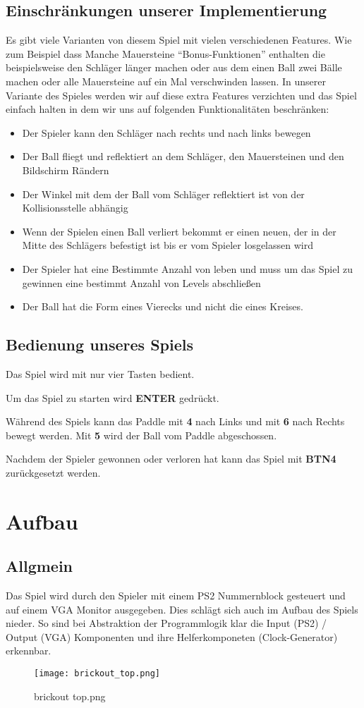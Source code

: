 \documentclass{scrartcl}
\begin{document}
\subsection{Einschränkungen unserer Implementierung}
Es gibt viele Varianten von diesem Spiel mit vielen verschiedenen Features.
Wie zum Beispiel dass Manche Mauersteine "`Bonus-Funktionen"' enthalten die beispielsweise den Schläger länger machen oder aus dem einen Ball zwei Bälle machen oder alle Mauersteine auf ein Mal verschwinden lassen.
In unserer Variante des Spieles werden wir auf diese extra Features verzichten und das Spiel einfach halten in dem wir uns auf folgenden Funktionalitäten beschränken:
\begin{itemize}
  \item Der Spieler kann den Schläger nach rechts und nach links bewegen
  \item Der Ball fliegt und reflektiert an dem Schläger, den Mauersteinen und den Bildschirm Rändern
  \item Der Winkel mit dem der Ball vom Schläger reflektiert ist von der Kollisionsstelle abhängig
  \item Wenn der Spielen einen Ball verliert bekommt er einen neuen, der in der Mitte des Schlägers befestigt ist bis er vom Spieler losgelassen wird
  \item Der Spieler hat eine Bestimmte Anzahl von leben und muss um das Spiel zu gewinnen eine bestimmt Anzahl von Levels abschließen
  \item Der Ball hat die Form eines Vierecks und nicht die eines Kreises.
\end{itemize}


\subsection{Bedienung unseres Spiels}
Das Spiel wird mit nur vier Tasten bedient.

Um das Spiel zu starten wird \textbf{ENTER} gedrückt.

Während des Spiels kann das Paddle mit \textbf{4} nach Links und mit \textbf{6}
nach Rechts bewegt werden. Mit \textbf{5} wird der Ball vom Paddle abgeschossen.

Nachdem der Spieler gewonnen oder verloren hat kann das Spiel mit \textbf{BTN4}
zurückgesetzt werden.

\section{Aufbau}
\subsection{Allgmein}
Das Spiel wird durch den Spieler mit einem PS2 Nummernblock gesteuert und auf
einem VGA Monitor ausgegeben.
Dies schlägt sich auch im Aufbau des Spiels nieder.
So sind bei Abstraktion der Programmlogik klar die Input (PS2) / Output (VGA)
Komponenten und ihre Helferkomponeten (Clock-Generator) erkennbar.
\begin{figure}[ht]
	\centering
	\texttt{[image: brickout\_top.png]}
	\caption{brickout top.png}
\end{figure}
\end{document}
